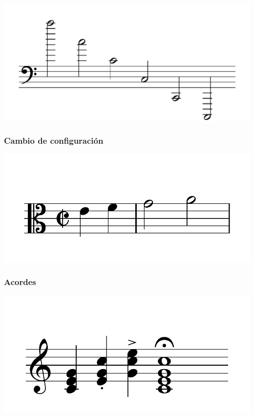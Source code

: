 \documentclass{article}
\begin{document}
\includegraphics[scale=0.5]{figures_tests/pdf/skern/octaves.pdf}

\subsubsection{Cambio de configuración}
\includegraphics[scale=0.5]{figures_tests/pdf/skern/changeconfiguration.pdf}

\subsubsection{Acordes}
\includegraphics[scale=0.5]{figures_tests/pdf/skern/chords.pdf}
\end{document}
